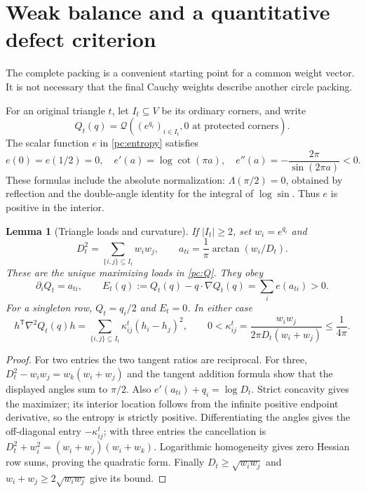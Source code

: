 \documentclass[11pt]{article}
\numberwithin{equation}{section}
\newtheorem{lemma}[theorem]{Lemma}
\theoremstyle{definition}\newtheorem{definition}[theorem]{Definition}
\theoremstyle{remark}\newtheorem{remark}[theorem]{Remark}
\newcommand{\calQ}{\mathcal Q}
\begin{document}
\section{Weak balance and a quantitative defect criterion}

The complete packing is a convenient starting point for a common
weight vector. It is not necessary that the final Cauchy weights
describe another circle packing.

For an original triangle \(t\), let \(I_t\subseteq V\) be its
ordinary corners, and write
\[
 Q_t(q)=\calQ((e^{q_i})_{i\in I_t},0\text{ at protected corners}).
\]
The scalar function \(e\) in \eqref{pc:entropy} satisfies
\[
 e(0)=e(1/2)=0,\quad e'(a)=\log\cot(\pi a),\quad
 e''(a)=-\frac{2\pi}{\sin(2\pi a)}<0.
\]
These formulas include the absolute normalization:
\(\Lambda(\pi/2)=0\), obtained by reflection and the double-angle
identity for the integral of \(\log\sin\).
Thus \(e\) is positive in the interior.

\begin{lemma}[Triangle loads and curvature]\label{pc:triangle-calculus}
If \(|I_t|\ge2\), set \(w_i=e^{q_i}\) and
\[
 D_t^2=\sum_{\{i,j\}\subseteq I_t}w_iw_j,\qquad
             a_{ti}=\frac1\pi\arctan(w_i/D_t).
\]
These are the unique maximizing loads in \eqref{pc:Q}. They obey
\[
 \partial_i Q_t=a_{ti},\qquad
 E_t(q):=Q_t(q)-q\cdot\nabla Q_t(q)=\sum_i e(a_{ti})>0.
\]
For a singleton row, \(Q_t=q_i/2\) and \(E_t=0\). In either case
\begin{equation}\label{pc:hessian}
 h^{\mathsf T}\nabla^2Q_t(q)h
 =\sum_{\{i,j\}\subseteq I_t}\kappa_{ij}^t(h_i-h_j)^2,
 \qquad
 0<\kappa_{ij}^t=\frac{w_iw_j}{2\pi D_t(w_i+w_j)}
                                               \le\frac1{4\pi}.
\end{equation}
\end{lemma}
\begin{proof}
For two entries the two tangent ratios are reciprocal. For three,
\(D_t^2-w_iw_j=w_k(w_i+w_j)\) and the tangent addition formula
show that the displayed angles sum to \(\pi/2\).
Also \(e'(a_{ti})+q_i=\log D_t\). Strict concavity gives the
maximizer; its interior location follows from the infinite positive
endpoint derivative, so the entropy is strictly positive.
Differentiating the angles gives the off-diagonal entry
\(-\kappa_{ij}^t\); with three entries the cancellation is
\(D_t^2+w_i^2=(w_i+w_j)(w_i+w_k)\).
Logarithmic homogeneity gives zero Hessian row sums, proving
the quadratic form. Finally
\(D_t\ge\sqrt{w_iw_j}\) and \(w_i+w_j\ge2\sqrt{w_iw_j}\)
give its bound.
\end{proof}
\end{document}
